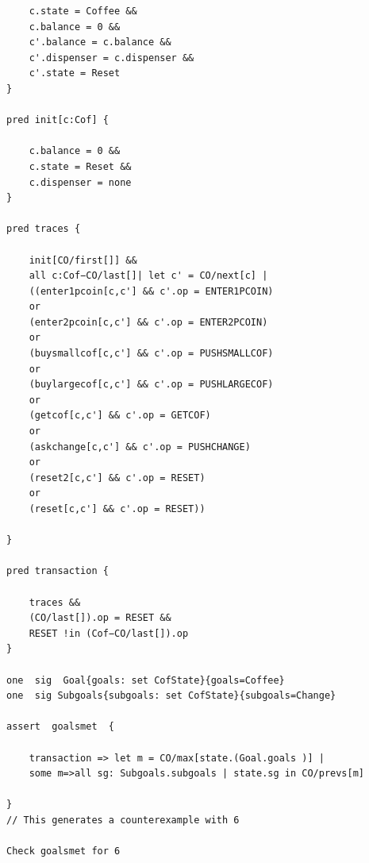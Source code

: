 \documentclass[a4paper,12pt]{report}
\begin{document}
\begin{verbatim}
	c.state = Coffee &&
	c.balance = 0 &&
	c'.balance = c.balance &&
	c'.dispenser = c.dispenser &&
	c'.state = Reset
}

pred init[c:Cof] {

	c.balance = 0 &&
	c.state = Reset &&
	c.dispenser = none
}

pred traces {

	init[CO/first[]] &&
	all c:Cof−CO/last[]| let c' = CO/next[c] |
	((enter1pcoin[c,c'] && c'.op = ENTER1PCOIN)
	or
	(enter2pcoin[c,c'] && c'.op = ENTER2PCOIN)
	or
	(buysmallcof[c,c'] && c'.op = PUSHSMALLCOF)
	or
	(buylargecof[c,c'] && c'.op = PUSHLARGECOF)
	or
	(getcof[c,c'] && c'.op = GETCOF)
	or
	(askchange[c,c'] && c'.op = PUSHCHANGE)
	or
	(reset2[c,c'] && c'.op = RESET)
	or
	(reset[c,c'] && c'.op = RESET))

}

pred transaction {

	traces &&
	(CO/last[]).op = RESET &&
	RESET !in (Cof−CO/last[]).op
}

one  sig  Goal{goals: set CofState}{goals=Coffee}
one  sig Subgoals{subgoals: set CofState}{subgoals=Change}

assert  goalsmet  {

	transaction => let m = CO/max[state.(Goal.goals )] |
	some m=>all sg: Subgoals.subgoals | state.sg in CO/prevs[m]
	
}
// This generates a counterexample with 6

Check goalsmet for 6

\end{verbatim}
\end{document}
